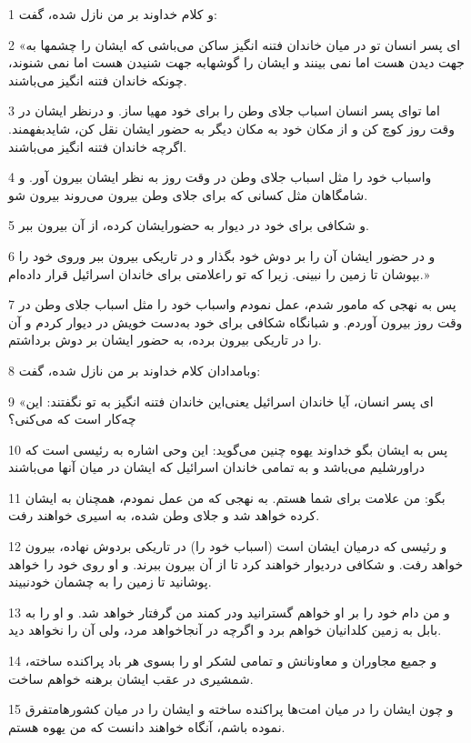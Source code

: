\par 1 و کلام خداوند بر من نازل شده، گفت:
\par 2 «ای پسر انسان تو در میان خاندان فتنه انگیز ساکن می‌باشی که ایشان را چشمها به جهت دیدن هست اما نمی بینند و ایشان را گوشهابه جهت شنیدن هست اما نمی شنوند، چونکه خاندان فتنه انگیز می‌باشند.
\par 3 اما تو‌ای پسر انسان اسباب جلای وطن را برای خود مهیا ساز. و درنظر ایشان در وقت روز کوچ کن و از مکان خود به مکان دیگر به حضور ایشان نقل کن، شایدبفهمند. اگرچه خاندان فتنه انگیز می‌باشند.
\par 4 واسباب خود را مثل اسباب جلای وطن در وقت روز به نظر ایشان بیرون آور. و شامگاهان مثل کسانی که برای جلای وطن بیرون می‌روند بیرون شو.
\par 5 و شکافی برای خود در دیوار به حضورایشان کرده، از آن بیرون ببر.
\par 6 و در حضور ایشان آن را بر دوش خود بگذار و در تاریکی بیرون ببر وروی خود را بپوشان تا زمین را نبینی. زیرا که تو راعلامتی برای خاندان اسرائیل قرار داده‌ام.»
\par 7 پس به نهجی که مامور شدم، عمل نمودم واسباب خود را مثل اسباب جلای وطن در وقت روز بیرون آوردم. و شبانگاه شکافی برای خود به‌دست خویش در دیوار کردم و آن را در تاریکی بیرون برده، به حضور ایشان بر دوش برداشتم.
\par 8 وبامدادان کلام خداوند بر من نازل شده، گفت:
\par 9 «ای پسر انسان، آیا خاندان اسرائیل یعنی‌این خاندان فتنه انگیز به تو نگفتند: این چه‌کار است که می‌کنی؟
\par 10 پس به ایشان بگو خداوند یهوه چنین می‌گوید: این وحی اشاره به رئیسی است که دراورشلیم می‌باشد و به تمامی خاندان اسرائیل که ایشان در میان آنها می‌باشند
\par 11 بگو: من علامت برای شما هستم. به نهجی که من عمل نمودم، همچنان به ایشان کرده خواهد شد و جلای وطن شده، به اسیری خواهند رفت.
\par 12 و رئیسی که درمیان ایشان است (اسباب خود را) در تاریکی بردوش نهاده، بیرون خواهد رفت. و شکافی دردیوار خواهند کرد تا از آن بیرون ببرند. و او روی خود را خواهد پوشانید تا زمین را به چشمان خودنبیند.
\par 13 و من دام خود را بر او خواهم گسترانید ودر کمند من گرفتار خواهد شد. و او را به بابل به زمین کلدانیان خواهم برد و اگرچه در آنجاخواهد مرد، ولی آن را نخواهد دید.
\par 14 و جمیع مجاوران و معاونانش و تمامی لشکر او را بسوی هر باد پراکنده ساخته، شمشیری در عقب ایشان برهنه خواهم ساخت.
\par 15 و چون ایشان را در میان امت‌ها پراکنده ساخته و ایشان را در میان کشورهامتفرق نموده باشم، آنگاه خواهند دانست که من یهوه هستم.
